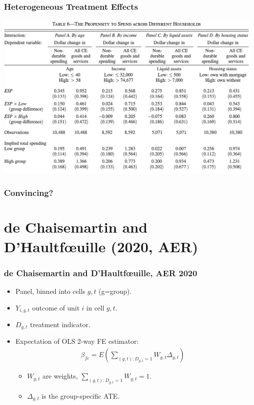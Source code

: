 \documentclass[english,xcolor=svgnames]{beamer}
\begin{document}
\begin{frame}
\frametitle[alignment=center]{Heterogeneous Treatment Effects}
\centering
\includegraphics[scale=0.6]{figures/PSMJTAB6.png}
\end{frame}


\begin{frame}
\frametitle[alignment=center]{Convincing?}

\end{frame}


\section{de Chaisemartin and D'Haultf{\oe}uille (2020, AER)}

\begin{frame}
\frametitle[alignment=center]{de Chaisemartin and D'Haultf{\oe}uille, AER 2020}
\begin{itemize}
	\item Panel, binned into cells $g,t$ (g=group).
	\item $Y_{i,g,t}$ outcome of unit $i$ in cell $g,t$.
	\item $D_{g,t}$ treatment indicator.
	\item Expectation of OLS 2-way FE estimator:
	\begin{align*}
		\beta_{fe} = E \left(\sum_{(g,t):D_{g,t}=1} W_{g,t}\Delta_{g,t}\right)
	\end{align*}
	\begin{itemize}
		\item $W_{g,t}$ are weights, $\sum_{(g,t):D_{g,t}=1} W_{g,t}=1$.
		\item $\Delta_{g,t}$ is the group-specific ATE.
	\end{itemize}
\end{itemize}
\end{frame}
\end{document}
